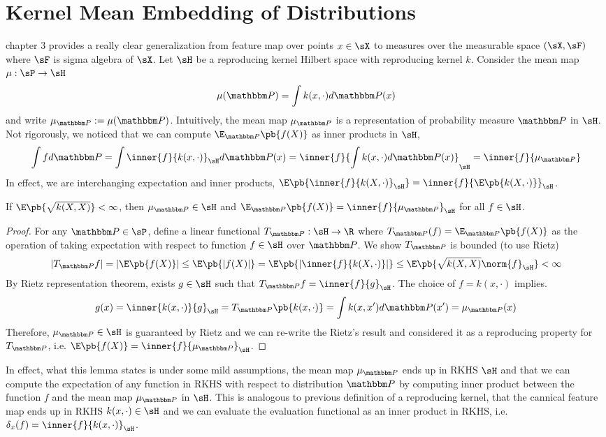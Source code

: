 \documentclass[11pt]{article}
\begin{document}
\section{Kernel Mean Embedding of Distributions}

\cite{muandetKernelMeanEmbedding2017} chapter 3 provides a really clear generalization from feature map over points $x\in\sX$ to measures over the measurable space $(\sX,\sF)$ where $\sF$ is sigma algebra of $\sX$. Let $\sH$ be a reproducing kernel Hilbert space with reproducing kernel $k$. Consider the mean map $\mu:\sP\to\sH$
\begin{align}
    \mu(\bbP)
        = \int k(x,\cdot) d\bbP(x)
\end{align}
and write $\mu_{\bbP} := \mu(\bbP)$. Intuitively, the mean map $\mu_{\bbP}$ is a representation of probability measure $\bbP$ in $\sH$. Not rigorously, we noticed that we can compute $\E_{\bbP}\pb{f(X)}$ as inner products in $\sH$,
\[
    \int f d\bbP
        = \int \inner{f}{k(x,\cdot)}_{\sH} d\bbP(x)
        = \inner{f}{\int k(x,\cdot)d\bbP(x)}_{\sH}
        = \inner{f}{\mu_{\bbP}}
\]
In effect, we are interchanging expectation and inner products, $\E\pb{\inner{f}{k(X,\cdot)}_{\sH}} = \inner{f}{\E\pb{k(X,\cdot)}}_{\sH}$.
\begin{lemma}
    \label{lemma:mean_embedding_reproducing_property}
    If $\E\pb{\sqrt{k(X,X)}} < \infty$, then $\mu_{\bbP} \in \sH$ and $\E_{\bbP}\pb{f(X)} = \inner{f}{\mu_{\bbP}}_{\sH}$ for all $f\in\sH$.
\end{lemma}
\begin{proof}
    For any $\bbP\in\sP$, define a linear functional $T_{\bbP}:\sH\to\R$ where $T_{\bbP}(f) = \E_{\bbP}\pb{f(X)}$ as the operation of taking expectation with respect to function $f\in\sH$ over $\bbP$. We show $T_{\bbP}$ is bounded (to use Rietz)
    \begin{align*}
        |T_{\bbP}f|
            = |\E\pb{f(X)}|
            \leq \E\pb{|f(X)|}
            = \E\pb{ \left|  \inner{f}{k(X,\cdot)} \right| }
            \leq \E\pb{ \sqrt{k(X,X)} \norm{f}_{\sH} }
            < \infty
    \end{align*}
    By Rietz representation theorem, exists $g\in\sH$ such that $T_{\bbP} f = \inner{f}{g}_{\sH}$. The choice of $f = k(x,\cdot)$ implies.
    \[
        g(x)
            = \inner{k(x,\cdot)}{g}_{\sH} 
            = T_{\bbP}\pb{k(x,\cdot)}
            = \int k(x,x') d\bbP(x')
            = \mu_{\bbP}(x)
    \]
    Therefore, $\mu_{\bbP}\in\sH$ is guaranteed by Rietz and we can re-write the Rietz's result and considered it as a reproducing property for $T_{\bbP}$, i.e. $\E\pb{f(X)} = \inner{f}{\mu_{\bbP}}_{\sH}$.
\end{proof}
In effect, what this lemma states is under some mild assumptions, the mean map $\mu_{\bbP}$ ends up in RKHS $\sH$ and that we can compute the expectation of any function in RKHS with respect to distribution $\bbP$ by computing inner product between the function $f$ and the mean map $\mu_{\bbP}$ in $\sH$. This is analogous to previous definition of a reproducing kernel, that the cannical feature map ends up in RKHS $k(x,\cdot) \in \sH$ and we can evaluate the evaluation functional as an inner product in RKHS, i.e. $\delta_x(f) = \inner{f}{k(x,\cdot)}_{\sH}$. 
\end{document}
